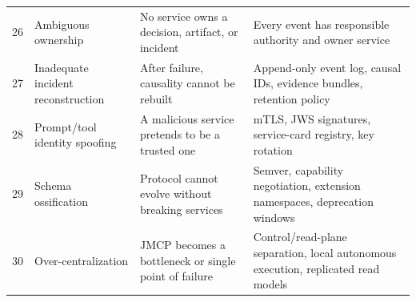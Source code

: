 \documentclass[10pt,journal,onecolumn]{IEEEtran}
\begin{document}
\begin{longtable}{P{0.04\textwidth} P{0.18\textwidth} P{0.35\textwidth} P{0.35\textwidth}}
26 & Ambiguous ownership & No service owns a decision, artifact, or incident & Every event has responsible authority and owner service \\
27 & Inadequate incident reconstruction & After failure, causality cannot be rebuilt & Append-only event log, causal IDs, evidence bundles, retention policy \\
28 & Prompt/tool identity spoofing & A malicious service pretends to be a trusted one & mTLS, JWS signatures, service-card registry, key rotation \\
29 & Schema ossification & Protocol cannot evolve without breaking services & Semver, capability negotiation, extension namespaces, deprecation windows \\
30 & Over-centralization & JMCP becomes a bottleneck or single point of failure & Control/read-plane separation, local autonomous execution, replicated read models \\
\bottomrule
\end{longtable}
\end{document}
